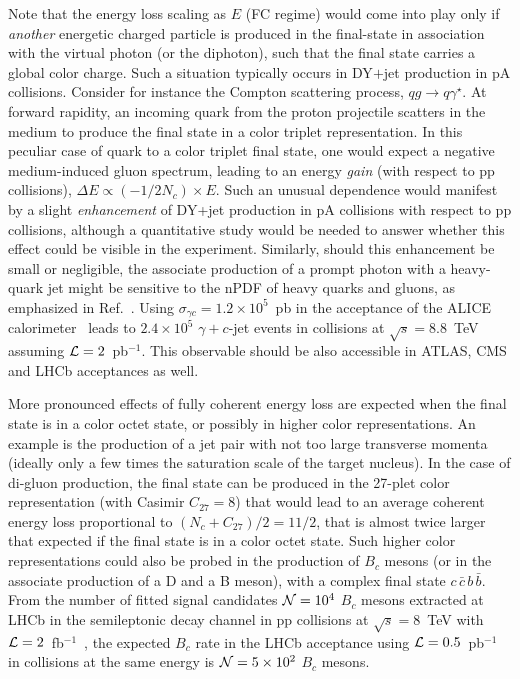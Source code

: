 \documentclass[../report.tex]{subfiles}
\begin{document}
Note that the energy loss scaling as $E$ (FC regime) would come into play only if {\it another} energetic charged particle is produced in the final-state in association with the virtual photon (or the diphoton), such that the final state carries a global color charge. Such a situation typically occurs in DY$+$jet production in pA collisions. Consider for instance the Compton scattering process, $qg \to q\gamma^\star$. At forward rapidity, an incoming quark from the proton projectile scatters in the medium to produce the final state in a color triplet representation. In this peculiar case of quark to a color triplet final state, one would expect a negative medium-induced gluon spectrum, leading to an energy \emph{gain} (with respect to pp collisions), $\Delta E \propto (-1/2N_c)\times E$. Such an unusual dependence would manifest by a slight \emph{enhancement} of DY+jet production in pA collisions with respect to pp collisions, although a quantitative study would be needed to answer whether this effect could be visible in the experiment. Similarly, should this enhancement be small or negligible, the associate production of a prompt photon with a heavy-quark jet might be sensitive to the nPDF of heavy quarks and gluons, as emphasized in Ref.~\cite{Stavreva:2010mw}. Using $\sigma_{\gamma c} = 1.2\times10^5$~pb in the acceptance of the ALICE calorimeter~\cite{Stavreva:2010mw} leads to $2.4\times10^5$ $\gamma+c$-jet events in \pPb collisions at $\sqrt{s}=8.8$~TeV assuming ${\cal L}=2$~pb$^{-1}$. This observable should be also accessible in ATLAS, CMS and LHCb acceptances as well.

More pronounced effects of fully coherent energy loss are expected when the final state is in a color octet state, or possibly in higher color representations. An example is the production of a jet pair with not too large transverse momenta (ideally only a few times the saturation scale of the target nucleus). In the case of di-gluon production, the final state can be produced in the 27-plet color representation (with Casimir $C_{27}=8$) that would lead to an average coherent energy loss proportional to $(N_c+C_{27})/2=11/2$, that is almost twice larger that expected if the final state is in a color octet state. Such higher color representations could also be probed in the production of $B_c$ mesons (or in the associate production of a D and a B meson), with a complex final state $c\,\bar{c}\,b\,\bar{b}$. From the number of fitted signal candidates ${\cal N}=10^4$ $B_c$ mesons extracted at LHCb in the semileptonic decay channel in pp collisions at $\sqrt{s}=8$~TeV with ${\cal L}=2$~fb$^{-1}$~\cite{Aaij:2014bva}, the expected $B_c$ rate in the LHCb acceptance using ${\cal L}=0.5$~pb$^{-1}$ in \pPb collisions at the same energy is ${\cal N}=5\times 10^2$ $B_c$ mesons.
\end{document}
